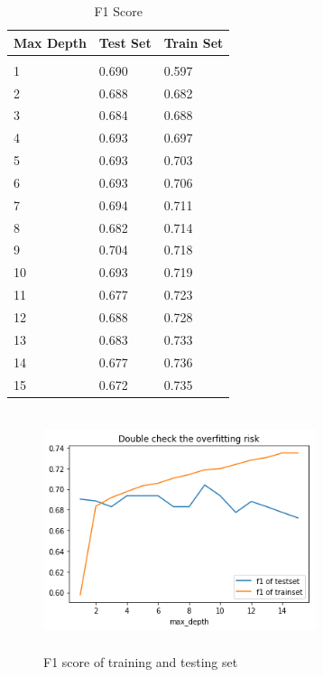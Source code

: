 \documentclass{article} %
\begin{document}
\begin{table}[H]
	\caption{F1 Score}
	\label{sample-table}
	\begin{center}
		\begin{tabular}{|l|l|l|}
			\multicolumn{1}{c}{\bf Max Depth}  
			&\multicolumn{1}{c}{\bf Test Set}
			&\multicolumn{1}{c}{\bf Train Set}
			\\ \hline & &  \\
			1        &0.690 &0.597	 \\
			2        &0.688	&0.682	  \\
			3        &0.684	&0.688	 \\
			4        &0.693	&0.697	 \\
			5        &0.693	&0.703 \\
			6        &0.693 &0.706   \\
			7        &0.694 &0.711   \\
			8        &0.682 &0.714   \\
			9        &0.704 &0.718    \\
			10       &0.693  &0.719    \\
			11       &0.677  &0.723   \\
			12       &0.688 &0.728  \\
			13       &0.683 &0.733  \\
			14       &0.677  &0.736  \\
			15       &0.672 &0.735  \\
			\hline
		\end{tabular}
	\end{center}
\end{table}


\begin{figure}[H]
	\centering
	\includegraphics[height=7cm, width=8cm]{2.png}
	\caption{F1 score of training and testing set}
\end{figure}
\end{document}

